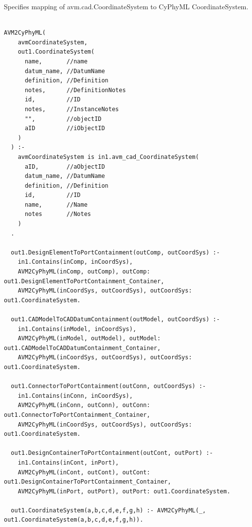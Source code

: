 Specifies mapping of avm.cad.CoordinateSystem to CyPhyML CoordinateSystem.
\begin{lstlisting}

AVM2CyPhyML(
    avmCoordinateSystem,
    out1.CoordinateSystem(
      name,       //name
      datum_name, //DatumName
      definition, //Definition
      notes,      //DefinitionNotes
      id,         //ID
      notes,      //InstanceNotes
      "",         //objectID
      aID         //iObjectID
    )
  ) :-
    avmCoordinateSystem is in1.avm_cad_CoordinateSystem(
      aID,        //aObjectID
      datum_name, //DatumName
      definition, //Definition
      id,         //ID
      name,       //Name
      notes       //Notes
    )
  .

  out1.DesignElementToPortContainment(outComp, outCoordSys) :-
    in1.Contains(inComp, inCoordSys),
    AVM2CyPhyML(inComp, outComp), outComp: out1.DesignElementToPortContainment_Container,
    AVM2CyPhyML(inCoordSys, outCoordSys), outCoordSys: out1.CoordinateSystem.

  out1.CADModelToCADDatumContainment(outModel, outCoordSys) :-
    in1.Contains(inModel, inCoordSys),
    AVM2CyPhyML(inModel, outModel), outModel: out1.CADModelToCADDatumContainment_Container,
    AVM2CyPhyML(inCoordSys, outCoordSys), outCoordSys: out1.CoordinateSystem.

  out1.ConnectorToPortContainment(outConn, outCoordSys) :-
    in1.Contains(inConn, inCoordSys),
    AVM2CyPhyML(inConn, outConn), outConn: out1.ConnectorToPortContainment_Container,
    AVM2CyPhyML(inCoordSys, outCoordSys), outCoordSys: out1.CoordinateSystem.

  out1.DesignContainerToPortContainment(outCont, outPort) :-
    in1.Contains(inCont, inPort),
    AVM2CyPhyML(inCont, outCont), outCont: out1.DesignContainerToPortContainment_Container,
    AVM2CyPhyML(inPort, outPort), outPort: out1.CoordinateSystem.

  out1.CoordinateSystem(a,b,c,d,e,f,g,h) :- AVM2CyPhyML(_, out1.CoordinateSystem(a,b,c,d,e,f,g,h)).


\end{lstlisting}

